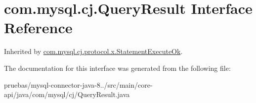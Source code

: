 \hypertarget{interfacecom_1_1mysql_1_1cj_1_1_query_result}{}\section{com.\+mysql.\+cj.\+Query\+Result Interface Reference}
\label{interfacecom_1_1mysql_1_1cj_1_1_query_result}


Inherited by \mbox{\hyperlink{classcom_1_1mysql_1_1cj_1_1protocol_1_1x_1_1_statement_execute_ok}{com.\+mysql.\+cj.\+protocol.\+x.\+Statement\+Execute\+Ok}}.



The documentation for this interface was generated from the following file\+:\begin{DoxyCompactItemize}
\item 
pruebas/mysql-\/connector-\/java-\/8../src/main/core-\/api/java/com/mysql/cj/Query\+Result.\+java\end{DoxyCompactItemize}
